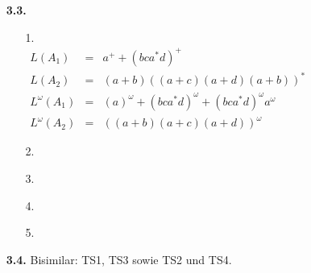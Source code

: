 \documentclass[a4paper,11pt,fleqn]{scrartcl}
\title{\titleinfo}
\author{\authorinfo}
\begin{document}
\maketitle
	\begin{enumerate}
	\item[\textbf{3.3.}]
		\begin{enumerate}
		\item[1.]\quad \\
        	\(
        	\begin{array}{lcl}
        		L(A_1) &=& a^+ + (bca^* d)^+\\
                L(A_2) &=& (a+b)((a+c)(a+d)(a+b))^*\\
        		L^\omega(A_1) &=& (a)^{\omega} + (bca^* d)^{\omega} + (bca^* d)^{\omega} a^{\omega}\\
        		L^\omega(A_2) &=& ((a+b)(a+c)(a+d))^{\omega}
	        \end{array}
        	\)
        \item[2.]\quad \\
        \item[3.]\quad \\
        \item[4.]\quad \\
        \item[5.]\quad \\
        
        \end{enumerate}
    \item[\textbf{3.4.}]
	    Bisimilar: TS1, TS3 sowie TS2 und TS4.
    \end{enumerate}
\end{document}
